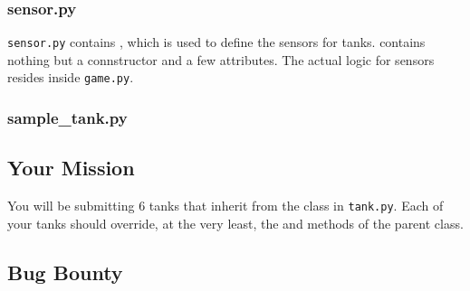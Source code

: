 \documentclass[11pt]{cselabheader}
\begin{document}
\subsubsection{sensor.py}
\label{subsubsec:sensor}
\texttt{sensor.py} contains , which is used to define
the sensors for tanks.  contains nothing but a connstructor
and a few attributes. The actual logic for sensors resides inside
\texttt{game.py}.

\subsubsection{sample\_tank.py}


\pagebreak
\subsection{Your Mission}
\label{subsec:ex}
You will be submitting 6 tanks that inherit from the  class
in \texttt{tank.py}. Each of your tanks should override, at the very least,
the  and  methods of
the parent class.

\begin{ex}
\end{ex}

\begin{ex}[coward.py]
\end{ex}

\begin{ex}[charger.py]
\end{ex}

\begin{ex}[turret.py]
\end{ex}

\begin{ex}[elephant.py]
\end{ex}

\begin{ex}[mouse.py]
\end{ex}

\begin{ex}[custom.py]
\end{ex}


\subsection{Bug Bounty}
\end{document}
